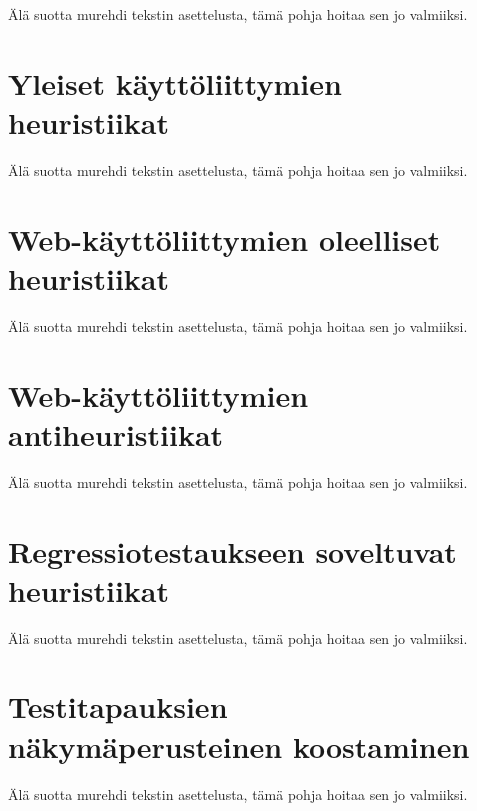 Älä suotta murehdi tekstin asettelusta, tämä pohja hoitaa sen jo valmiiksi.

\section{Yleiset käyttöliittymien heuristiikat}

Älä suotta murehdi tekstin asettelusta, tämä pohja hoitaa sen jo valmiiksi.

\section{Web-käyttöliittymien oleelliset heuristiikat}

Älä suotta murehdi tekstin asettelusta, tämä pohja hoitaa sen jo valmiiksi.

\section{Web-käyttöliittymien antiheuristiikat}

Älä suotta murehdi tekstin asettelusta, tämä pohja hoitaa sen jo valmiiksi.

\section{Regressiotestaukseen soveltuvat heuristiikat}

Älä suotta murehdi tekstin asettelusta, tämä pohja hoitaa sen jo valmiiksi.

\section{Testitapauksien näkymäperusteinen koostaminen}

Älä suotta murehdi tekstin asettelusta, tämä pohja hoitaa sen jo valmiiksi.
